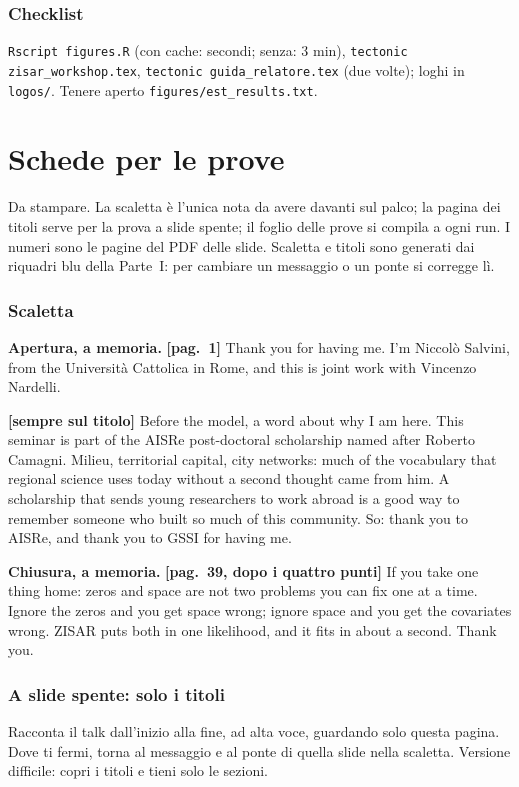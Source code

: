 \documentclass[11pt,a4paper]{article}
\newcommand{\scalettalista}{}\newcommand{\titolilista}{}
\newcommand{\testoapertura}{\textbf{[pag.~1]} Thank you for having me. I'm Niccolò Salvini, from the Università Cattolica in Rome, and this is joint work with Vincenzo Nardelli.\par
\textbf{[sempre sul titolo]} Before the model, a word about why I am here. This seminar is part of the AISRe post-doctoral scholarship named after Roberto Camagni. Milieu, territorial capital, city networks: much of the vocabulary that regional science uses today without a second thought came from him. A scholarship that sends young researchers to work abroad is a good way to remember someone who built so much of this community. So: thank you to AISRe, and thank you to GSSI for having me.}
\newcommand{\testochiusura}{\textbf{[pag.~39, dopo i quattro punti]} If you take one thing home: zeros and space are not two problems you can fix one at a time. Ignore the zeros and you get space wrong; ignore space and you get the covariates wrong. ZISAR puts both in one likelihood, and it fits in about a second. Thank you.}
\begin{document}
\section{Checklist}
\texttt{Rscript figures.R} (con cache: secondi; senza: 3 min), \texttt{tectonic zisar\_workshop.tex}, \texttt{tectonic guida\_relatore.tex} (due volte); loghi in \texttt{logos/}. Tenere aperto \texttt{figures/est\_results.txt}.

\part{Schede per le prove}
Da stampare. La scaletta è l'unica nota da avere davanti sul palco; la pagina dei titoli serve per la prova a slide spente; il foglio delle prove si compila a ogni run. I numeri sono le pagine del PDF delle slide. Scaletta e titoli sono generati dai riquadri blu della Parte~I: per cambiare un messaggio o un ponte si corregge lì.

\clearpage
\section{Scaletta}\label{sec:scaletta}
{\small
\textbf{Apertura, a memoria.} \testoapertura

\begin{itemize}[leftmargin=3.2em,labelwidth=2.8em,labelsep=0.4em,align=left,itemsep=3pt,parsep=0pt]
\scalettalista
\end{itemize}

\textbf{Chiusura, a memoria.} \testochiusura\par}

\clearpage
\section{A slide spente: solo i titoli}\label{sec:titoli}
Racconta il talk dall'inizio alla fine, ad alta voce, guardando solo questa pagina. Dove ti fermi, torna al messaggio e al ponte di quella slide nella scaletta. Versione difficile: copri i titoli e tieni solo le sezioni.
\begin{itemize}[leftmargin=3.2em,labelwidth=2.8em,labelsep=0.4em,align=left,nosep]
\titolilista
\end{itemize}

\clearpage
\end{document}
